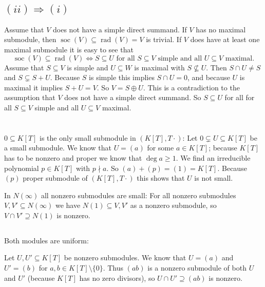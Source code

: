 \documentclass[a4paper,10pt]{article}
\theoremstyle{definition}
\newcommand{\soc}{\operatorname{soc}}
\newcommand{\rad}{\operatorname{rad}}
\begin{document}
\subsection*{$(ii) \Rightarrow (i)$}
Assume that $V$ does not have a simple direct summand. If $V$ has no maximal submodule, then $\soc(V) \subseteq \rad(V) = V$ is trivial.
If $V$ does have at least one maximal submodule it is easy to see that
\[
 \soc(V) \subseteq \rad(V) \Leftrightarrow S \subseteq U \text{ for all } S \subseteq V \text{ simple and all } U \subseteq V \text{ maximal}.
\]
Assume that $S \subseteq V$ is simple and $U \subseteq W$ is maximal with $S \nsubseteq U$. Then $S \cap U \neq S$ and $S \subsetneq S+U$. Because $S$ is simple this implies $S \cap U = 0$, and because $U$ is maximal it implies $S+U = V$. So $V = S \oplus U$. This is a contradiction to the assumption that $V$ does not have a simple direct summand. So $S \subseteq U$ for all for all $S \subseteq V$ simple and all $U \subseteq V$ maximal.





\section{}


\subsection{}
$0 \subseteq K[T]$ is the only small submodule in $(K[T],T\cdot)$: Let $0 \subsetneq U \subseteq K[T]$ be a small submodule. We know that $U = (a)$ for some $a \in K[T]$; because $K[T]$ has to be nonzero and proper we know that $\deg a \geq 1$. We find an irreducible polynomial $p \in K[T]$ with $p \nmid a$. So $(a) + (p) = (1) = K[T]$. Because $(p)$ proper submodule of $(K[T],T\cdot)$ this shows that $U$ is not small.

In $N(\infty)$ all nonzero submodules are small: For all nonzero submodules $V, V' \subseteq N(\infty)$ we have $N(1) \subseteq V, V'$ as a nonzero submodule, so $V \cap V' \supseteq N(1)$ is nonzero.

\subsection{}
Both modules are uniform:

Let $U, U' \subseteq K[T]$ be nonzero submodules. We know that $U = (a)$ and $U' = (b)$ for $a,b \in K[T] \setminus \{0\}$. Thus $(ab)$ is a nonzero submodule of both $U$ and $U'$ (because $K[T]$ has no zero divisors), so $U \cap U' \supseteq (ab)$ is nonzero.
\end{document}
